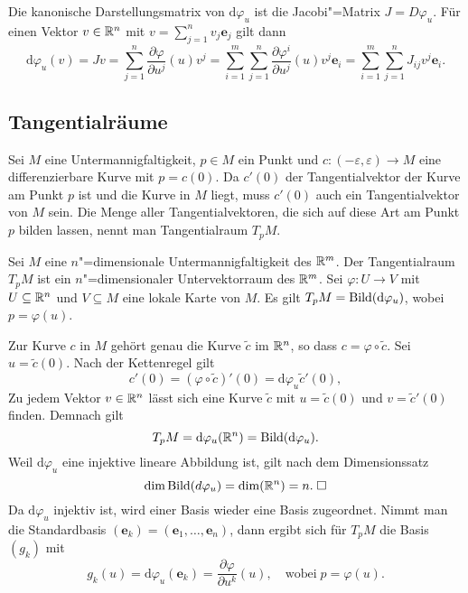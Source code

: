 Die kanonische Darstellungsmatrix von $\mathrm d\varphi_u$ ist die
Jacobi"=Matrix $J=D\varphi_u$. Für einen Vektor $v\in\mathbb R^n$ mit
$v=\sum_{j=1}^n v_j \mathbf e_j$ gilt dann
\begin{equation}
\mathrm d\varphi_u(v) = Jv
= \sum_{j=1}^n \frac{\partial\varphi}{\partial u^j}(u) v^j
= \sum_{i=1}^m\sum_{j=1}^n \frac{\partial\varphi^i}{\partial u^j}(u) v^j\mathbf e_i
= \sum_{i=1}^m\sum_{j=1}^n J_{ij} v^j\mathbf e_i.
\end{equation}

\subsection{Tangentialräume}

Sei $M$ eine Untermannigfaltigkeit, $p\in M$ ein Punkt und
$c\colon (-\varepsilon,\varepsilon)\to M$ eine differenzierbare Kurve
mit $p=c(0)$. Da $c'(0)$ der Tangentialvektor der Kurve am Punkt $p$
ist und die Kurve in $M$ liegt, muss $c'(0)$ auch ein Tangentialvektor
von $M$ sein. Die Menge aller Tangentialvektoren, die sich auf
diese Art am Punkt $p$ bilden lassen, nennt man Tangentialraum $T_p M$.

\begin{theorem}
Sei $M$ eine $n$"=dimensionale Untermannigfaltigkeit des $\mathbb R^m$.
Der Tangentialraum $T_p M$ ist ein $n$"=dimensionaler Untervektorraum
des $\mathbb R^m$. Sei $\varphi\colon U\to V$ mit $U\subseteq\mathbb R^n$ und
$V\subseteq M$ eine lokale Karte von $M$.  Es gilt
$T_p M = \operatorname{Bild}(\mathrm d\varphi_u)$, wobei $p=\varphi(u)$. 
\end{theorem}

\noindent{}
Zur Kurve $c$ in $M$ gehört genau die Kurve $\tilde c$ im $\mathbb R^n$, so
dass $c=\varphi\circ\tilde c$. Sei $u=\tilde c(0)$. Nach der
Kettenregel gilt%
\begin{equation}
c'(0) = (\varphi\circ\tilde c)'(0) = \mathrm d\varphi_u\tilde c'(0),
\end{equation}
Zu jedem Vektor $v\in\mathbb R^n$ lässt sich eine Kurve $\tilde c$
mit $u=\tilde c(0)$ und $v=\tilde c'(0)$ finden. Demnach gilt
\begin{equation}
T_p M = \mathrm d\varphi_u(\mathbb R^n) = \operatorname{Bild}(\mathrm d\varphi_u).
\end{equation}
Weil $\mathrm d\varphi_u$ eine injektive lineare Abbildung ist,
gilt nach dem Dimensionssatz%
\begin{equation}
\dim\operatorname{Bild}(d\varphi_u) = \dim(\mathbb R^n) = n.\;\Box
\end{equation}
Da $\mathrm d\varphi_u$ injektiv ist, wird einer Basis wieder eine
Basis zugeordnet. Nimmt man die Standardbasis
$(\mathbf e_k)=(\mathbf e_1,\ldots,\mathbf e_n)$, dann ergibt
sich für $T_p M$ die Basis $(g_k)$ mit
\begin{equation}
g_k(u) = \mathrm d\varphi_u(\mathbf e_k)
= \frac{\partial\varphi}{\partial u^k}(u),\quad\text{wobei}\; p=\varphi(u).
\end{equation}


